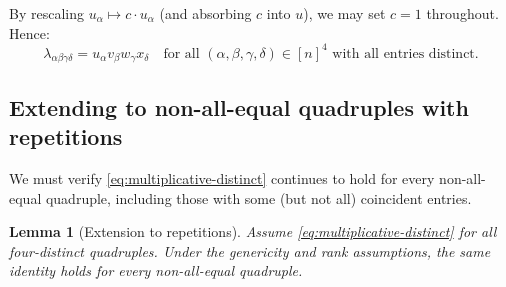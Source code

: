 \documentclass[12pt]{article}
\newtheorem{lemma}[theorem]{Lemma}
\theoremstyle{definition}
\begin{document}
By rescaling $u_\alpha\mapsto c\cdot u_\alpha$ (and absorbing $c$ into $u$), we may set
$c=1$ throughout. Hence:
\begin{equation}\label{eq:multiplicative-distinct}
\lambda_{\alpha\beta\gamma\delta}=u_\alpha v_\beta w_\gamma x_\delta\quad\text{for all }(\alpha,\beta,\gamma,\delta)\in[n]^4\text{ with all entries distinct}.
\end{equation}

\subsection{Extending to non-all-equal quadruples with repetitions}\label{sec:reverse-finish}

We must verify \eqref{eq:multiplicative-distinct} continues to hold for every non-all-equal
quadruple, including those with some (but not all) coincident entries.

\begin{lemma}[Extension to repetitions]\label{lem:extension}
Assume \eqref{eq:multiplicative-distinct} for all four-distinct quadruples. Under the
genericity and rank assumptions, the same identity holds for every non-all-equal quadruple.
\end{lemma}
\end{document}

